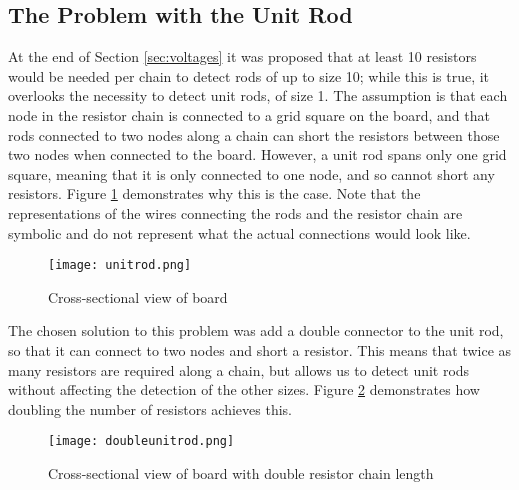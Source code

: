 \subsection{The Problem with the Unit Rod}

At the end of Section \ref{sec:voltages} it was proposed that at least 10 resistors would be needed per chain to detect rods of up to size 10; while this is true, it overlooks the necessity to detect unit rods, of size 1. The assumption is that each node in the resistor chain is connected to a grid square on the board, and that rods connected to two nodes along a chain can short the resistors between those two nodes when connected to the board. However, a unit rod spans only one grid square, meaning that it is only connected to one node, and so cannot short any resistors. Figure \ref{fig:unitrod} demonstrates why this is the case. Note that the representations of the wires connecting the rods and the resistor chain are symbolic and do not represent what the actual connections would look like. \\

\begin{figure}[H]
	\begin{center}
	\texttt{[image: unitrod.png]}\\ 
  	\caption{Cross-sectional view of board}
    \label{fig:unitrod}
    \end{center}
\end{figure}

The chosen solution to this problem was add a double connector to the unit rod, so that it can connect to two nodes and short a resistor. This means that twice as many resistors are required along a chain, but allows us to detect unit rods without affecting the detection of the other sizes. Figure \ref{fig:doubleunitrod} demonstrates how doubling the number of resistors achieves this.\\

\begin{figure}[H]
	\begin{center}
	\texttt{[image: doubleunitrod.png]}\\ 
  	\caption{Cross-sectional view of board with double resistor chain length}
    \label{fig:doubleunitrod}
    \end{center}
\end{figure}


